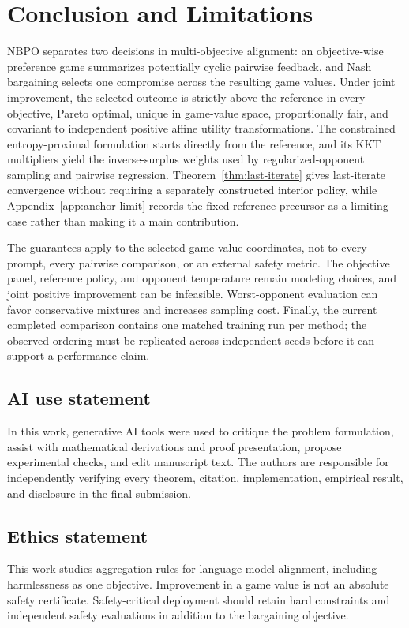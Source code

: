 \documentclass{article}
\theoremstyle{remark}
\theoremstyle{plain}
\newcommand{\NBPO}{\textsc{NBPO}}
\begin{document}
\section{Conclusion and Limitations}
\label{sec:conclusion}
\NBPO{} separates two decisions in multi-objective alignment: an objective-wise preference game summarizes potentially cyclic pairwise feedback, and Nash bargaining selects one compromise across the resulting game values. Under joint improvement, the selected outcome is strictly above the reference in every objective, Pareto optimal, unique in game-value space, proportionally fair, and covariant to independent positive affine utility transformations. The constrained entropy-proximal formulation starts directly from the reference, and its KKT multipliers yield the inverse-surplus weights used by regularized-opponent sampling and pairwise regression. Theorem~\ref{thm:last-iterate} gives last-iterate convergence without requiring a separately constructed interior policy, while Appendix~\ref{app:anchor-limit} records the fixed-reference precursor as a limiting case rather than making it a main contribution.

The guarantees apply to the selected game-value coordinates, not to every prompt, every pairwise comparison, or an external safety metric. The objective panel, reference policy, and opponent temperature remain modeling choices, and joint positive improvement can be infeasible. Worst-opponent evaluation can favor conservative mixtures and increases sampling cost. Finally, the current completed comparison contains one matched training run per method; the observed ordering must be replicated across independent seeds before it can support a performance claim.

\subsection*{AI use statement}
In this work, generative AI tools were used to critique the problem formulation, assist with mathematical derivations and proof presentation, propose experimental checks, and edit manuscript text. The authors are responsible for independently verifying every theorem, citation, implementation, empirical result, and disclosure in the final submission.

\subsection*{Ethics statement}
This work studies aggregation rules for language-model alignment, including harmlessness as one objective. Improvement in a game value is not an absolute safety certificate. Safety-critical deployment should retain hard constraints and independent safety evaluations in addition to the bargaining objective.
\end{document}
